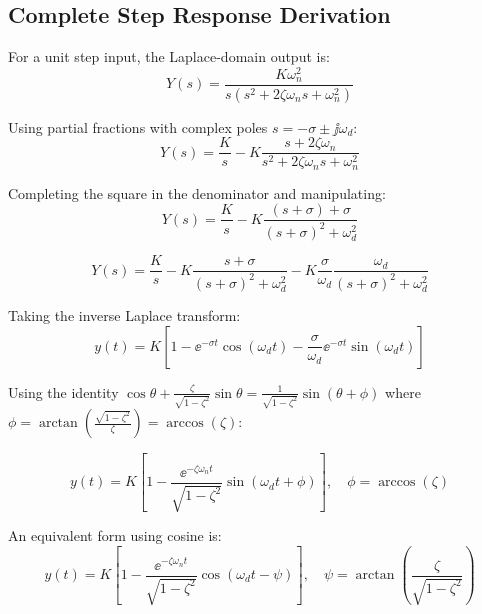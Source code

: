 \subsection{Complete Step Response Derivation}

For a unit step input, the Laplace-domain output is:
\begin{equation}
Y(s) = \frac{K\omega_n^2}{s(s^2 + 2\zeta\omega_n s + \omega_n^2)}
\end{equation}

Using partial fractions with complex poles $s = -\sigma \pm \jj\omega_d$:
\begin{equation}
Y(s) = \frac{K}{s} - K\frac{s + 2\zeta\omega_n}{s^2 + 2\zeta\omega_n s + \omega_n^2}
\end{equation}

Completing the square in the denominator and manipulating:
\begin{equation}
Y(s) = \frac{K}{s} - K\frac{(s + \sigma) + \sigma}{(s + \sigma)^2 + \omega_d^2}
\end{equation}

\begin{equation}
Y(s) = \frac{K}{s} - K\frac{s + \sigma}{(s + \sigma)^2 + \omega_d^2} - K\frac{\sigma}{\omega_d}\frac{\omega_d}{(s + \sigma)^2 + \omega_d^2}
\end{equation}

Taking the inverse Laplace transform:
\begin{equation}
y(t) = K\left[1 - \ee^{-\sigma t}\cos(\omega_d t) - \frac{\sigma}{\omega_d}\ee^{-\sigma t}\sin(\omega_d t)\right]
\end{equation}

Using the identity $\cos\theta + \frac{\zeta}{\sqrt{1-\zeta^2}}\sin\theta = \frac{1}{\sqrt{1-\zeta^2}}\sin(\theta + \phi)$ where $\phi = \arctan\left(\frac{\sqrt{1-\zeta^2}}{\zeta}\right) = \arccos(\zeta)$:

\begin{equation}
\boxed{y(t) = K\left[1 - \frac{\ee^{-\zeta\omega_n t}}{\sqrt{1-\zeta^2}}\sin(\omega_d t + \phi)\right], \quad \phi = \arccos(\zeta)}
\label{eq:underdamped_step}
\end{equation}

An equivalent form using cosine is:
\begin{equation}
y(t) = K\left[1 - \frac{\ee^{-\zeta\omega_n t}}{\sqrt{1-\zeta^2}}\cos(\omega_d t - \psi)\right], \quad \psi = \arctan\left(\frac{\zeta}{\sqrt{1-\zeta^2}}\right)
\end{equation}

